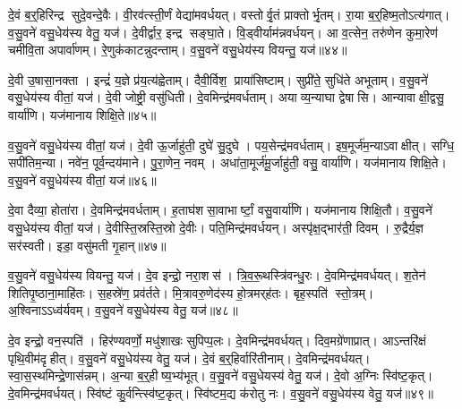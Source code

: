 दे॒वं ब॒र्॒हिरिन्द्र सुदे॒वन्दे॒वैः।
वी॒रव॑त्स्ती॒र्णं वेद्या॑मवर्धयत्।
वस्तोर्वृ॒तं प्राक्तोर्भृ॒तम्।
रा॒या ब॒र्॒हिष्म॒तोऽत्य॑गात्।
व॒सु॒वने॑ वसु॒धेय॑स्य वेतु॒ यज॑।
दे॒वीर्द्वार॒ इन्द्र सङ्घा॒ते।
वि॒ड्वीर्याम॑न्नवर्धयन्।
आ व॒त्सेन॒ तरु॑णेन कुमा॒रेण॑ चमीवि॒ता अपार्वा॑णम्।
रे॒णुक॑काटन्नुदन्ताम्।
व॒सु॒वने॑ वसु॒धेय॑स्य वियन्तु॒ यज॑॥४४॥

दे॒वी उ॒षासा॒नक्ता।
इन्द्रं॑ य॒ज्ञे प्र॑य॒त्य॑ह्वेताम्।
दैवी॒र्विश॒ प्राया॑सिष्टाम्।
सुप्री॑ते॒ सुधि॑ते अभूताम्।
व॒सु॒वने॑ वसु॒धेय॑स्य वीतां॒ यज॑।
दे॒वी जोष्ट्री॒ वसु॑धिती।
दे॒वमिन्द्र॑मवर्धताम्।
अयाव्य॒न्याघा द्वेषासि।
आन्यावाक्षी॒द्वसु॒ वार्या॑णि।
यज॑मानाय शिक्षि॒ते॥४५॥

व॒सु॒वने॑ वसु॒धेय॑स्य वीतां॒ यज॑।
दे॒वी ऊ॒र्जाहु॑ती॒ दुघे॑ सु॒दुघे।
पय॒सेन्द्र॑मवर्धताम्।
इष॒मूर्ज॑म॒न्याऽवाक्षीत्।
सग्धि॒ सपी॑तिम॒न्या।
नवे॑न॒ पूर्व॒न्दय॑माने।
पु॒रा॒णेन॒ नवम्।
अधा॑ता॒मूर्ज॑मू॒र्जाहु॑ती॒ वसु॒ वार्या॑णि।
यज॑मानाय शिक्षि॒ते।
व॒सु॒वने॑ वसु॒धेय॑स्य वीतां॒ यज॑॥४६॥

दे॒वा दैव्या॒ होता॑रा।
दे॒वमिन्द्र॑मवर्धताम्।
ह॒ताघ॑शसा॒वाभार्ष्टां॒ वसु॒वार्या॑णि।
यज॑मानाय शिक्षि॒तौ।
व॒सु॒वने॑ वसु॒धेय॑स्य वीतां॒ यज॑।
दे॒वीस्ति॒स्रस्ति॒स्रो दे॒वीः।
पति॒मिन्द्र॑मवर्धयन्।
अस्पृ॑क्ष॒द्भार॑ती॒ दिवम्।
रु॒द्रैर्य॒ज्ञ सर॑स्वती।
इडा॒ वसु॑मती गृ॒हान्॥४७॥

व॒सु॒वने॑ वसु॒धेय॑स्य वियन्तु॒ यज॑।
दे॒व इन्द्रो॒ नरा॒शस॑।
त्रि॒व॒रू॒थस्त्रि॑वन्धु॒रः।
दे॒वमिन्द्र॑मवर्धयत्।
श॒तेन॑ शितिपृ॒ष्ठाना॒माहि॑तः।
स॒हस्रे॑ण॒ प्रव॑र्तते।
मि॒त्रावरु॒णेद॑स्य हो॒त्रमर्‌ह॑तः।
बृह॒स्पति॑ स्तो॒त्रम्।
अ॒श्विनाऽऽध्व॑र्यवम्।
व॒सु॒वने॑ वसु॒धेय॑स्य वेतु॒ यज॑॥४८॥

दे॒व इन्द्रो॒ वन॒स्पति॑।
हिर॑ण्यवर्णो॒ मधु॑शाखः सुपिप्प॒लः।
दे॒वमिन्द्र॑मवर्धयत्।
दिव॒मग्रे॑णाप्रात्।
आऽन्तरि॑क्षं पृथि॒वीम॑दृहीत्।
व॒सु॒वने॑ वसु॒धेय॑स्य वेतु॒ यज॑।
दे॒वं ब॒र्॒हिर्वारि॑तीनाम्।
दे॒वमिन्द्र॑मवर्धयत्।
स्वा॒स॒स्थमिन्द्रे॒णास॑न्नम्।
अ॒न्या ब॒र्॒हीष्य॒भ्य॑भूत्।
व॒सु॒वने॑ वसु॒धेयस्य॑ वेतु॒ यज॑।
दे॒वो अ॒ग्निः स्वि॑ष्ट॒कृत्।
दे॒वमिन्द्र॑मवर्धयत्।
स्वि॑ष्टं कु॒र्वन्त्स्वि॑ष्ट॒कृत्।
स्वि॑ष्टम॒द्य क॑रोतु नः।
व॒सु॒वने॑ वसु॒धेय॑स्य वेतु॒ यज॑॥४९॥

